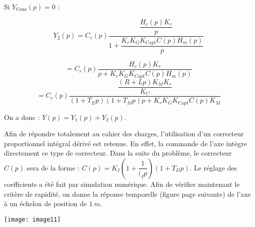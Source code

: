 \begin{multicols}{2}
\begin{corrige}
Si $Y_{\text{Cons}} (p)=0$ :

$$Y_2 (p)
=C_r (p) \dfrac{\dfrac{H_c (p) K_r}{p}}{1+\dfrac{K_r K_G K_{\text{Capt}} C(p) H_m (p)}{p} }$$

$$
=C_r (p) \dfrac{H_c (p) K_r}{p+K_r K_G K_{\text{Capt}} C(p) H_m (p) }$$
$$
=C_r (p) \dfrac{\dfrac{(R+Lp) K_M  K_r}{K_C }}{(1+T_E p)(1+T_M p)p+K_r K_G K_{\text{Capt}} C(p) K_M }$$

On a donc :
$Y(p)=Y_1 (p)+Y_2 (p)$.

\end{corrige}
\else
\fi

\ifprof
\begin{corrige}
\end{corrige}
\else
\fi

\ifprof
\begin{corrige}
\end{corrige}
\else
\fi

\ifprof
\begin{corrige}
\end{corrige}
\else
\fi

\ifprof
\else

Afin de répondre totalement au cahier des charges, l'utilisation d'un correcteur proportionnel intégral dérivé est retenue. En effet, la commande de l'axe intègre directement ce type de correcteur. Dans la suite du problème, le correcteur $C(p)$ sera de la forme : $C(p)=K_I \left(1+\dfrac{1}{(_I p}\right)\left(1+T_D p\right)$. Le réglage des coefficients a été fait par simulation numérique.
Afin de vérifier maintenant le critère de rapidité, on donne la réponse temporelle (figure page suivante) de l'axe à un échelon de position de $\SI{1}{m}$.

\fi

\ifprof
\begin{corrige}
\end{corrige}
\else
\fi

\ifprof
\else
 
 \begin{center}
\texttt{[image: image11]}
\end{center} 


\end{multicols}
